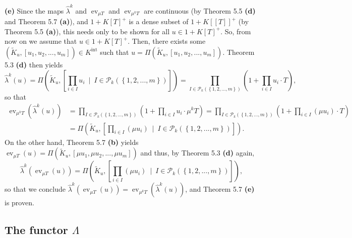 \documentclass[numbers=enddot,12pt,final,onecolumn,notitlepage]{scrartcl}%
\begin{document}
\textbf{(e)} Since the maps $\widehat{\lambda}^{k}$ and $\operatorname*{ev}%
_{\mu T}$ and $\operatorname*{ev}\nolimits_{\mu^{k}T}$ are continuous (by
Theorem 5.5 \textbf{(d) }and Theorem 5.7 \textbf{(a)}), and $1+K\left[
T\right]  ^{+}$ is a dense subset of $1+K\left[  \left[  T\right]  \right]
^{+}$ (by Theorem 5.5 \textbf{(a)}), this needs only to be shown for all
$u\in1+K\left[  T\right]  ^{+}$. So, from now on we assume that $u\in
1+K\left[  T\right]  ^{+}$. Then, there exists some $\left(  \widetilde{K}%
_{u},\left[  u_{1},u_{2},...,u_{m}\right]  \right)  \in K^{\operatorname*{int}%
}$ such that $u=\Pi\left(  \widetilde{K}_{u},\left[  u_{1},u_{2}%
,...,u_{m}\right]  \right)  $. Theorem 5.3 \textbf{(d)} then yields%
\[
\widehat{\lambda}^{k}\left(  u\right)  =\Pi\left(  \widetilde{K}_{u},\left[
\prod\limits_{i\in I}u_{i}\ \mid\ I\in\mathcal{P}_{k}\left(  \left\{
1,2,...,m\right\}  \right)  \right]  \right)  =\prod\limits_{I\in
\mathcal{P}_{k}\left(  \left\{  1,2,...,m\right\}  \right)  }\left(
1+\prod\limits_{i\in I}u_{i}\cdot T\right)  ,
\]
so that%
\begin{align*}
\operatorname*{ev}\nolimits_{\mu^{k}T}\left(  \widehat{\lambda}^{k}\left(
u\right)  \right)   &  =\prod\limits_{I\in\mathcal{P}_{k}\left(  \left\{
1,2,...,m\right\}  \right)  }\left(  1+\prod\limits_{i\in I}u_{i}\cdot\mu
^{k}T\right)  =\prod\limits_{I\in\mathcal{P}_{k}\left(  \left\{
1,2,...,m\right\}  \right)  }\left(  1+\prod\limits_{i\in I}\left(  \mu
u_{i}\right)  \cdot T\right) \\
&  =\Pi\left(  \widetilde{K}_{u},\left[  \prod\limits_{i\in I}\left(  \mu
u_{i}\right)  \ \mid\ I\in\mathcal{P}_{k}\left(  \left\{  1,2,...,m\right\}
\right)  \right]  \right)  .
\end{align*}
On the other hand, Theorem 5.7 \textbf{(b)} yields $\operatorname*{ev}_{\mu
T}\left(  u\right)  =\Pi\left(  \widetilde{K}_{u},\left[  \mu u_{1},\mu
u_{2},...,\mu u_{m}\right]  \right)  $ and thus, by Theorem 5.3 \textbf{(d)}
again,%
\[
\widehat{\lambda}^{k}\left(  \operatorname*{ev}\nolimits_{\mu T}\left(
u\right)  \right)  =\Pi\left(  \widetilde{K}_{u},\left[  \prod\limits_{i\in
I}\left(  \mu u_{i}\right)  \ \mid\ I\in\mathcal{P}_{k}\left(  \left\{
1,2,...,m\right\}  \right)  \right]  \right)  ,
\]
so that we conclude $\widehat{\lambda}^{k}\left(  \operatorname*{ev}_{\mu
T}\left(  u\right)  \right)  =\operatorname*{ev}_{\mu^{k}T}\left(
\widehat{\lambda}^{k}\left(  u\right)  \right)  $, and Theorem 5.7
\textbf{(e)} is proven.

\subsection{The functor $\Lambda$}
\end{document}
